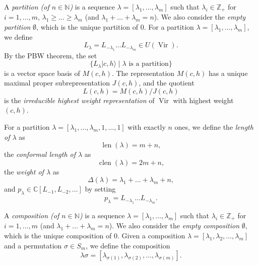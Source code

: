 \documentclass[a4paper, 12pt, reqno]{amsart}
\theoremstyle{remark}
\DeclareMathOperator{\Vir}{Vir}
\DeclareMathOperator{\len}{len}
\DeclareMathOperator{\clen}{clen}
\begin{document}
A \emph{partition (of $n \in \mathbb{N}$)} is a sequence $\lambda = [\lambda_1, \dots, \lambda_m]$ such that $\lambda_i \in \mathbb{Z}_+$ for $i = 1, \dots, m$, $\lambda_1 \ge \dots \ge \lambda_m$ (and $\lambda_1 + \dots + \lambda_m = n$).
We also consider the \emph{empty partition} $\emptyset$, which is the unique partition of $0$.
For a partition $\lambda = [\lambda_1, \dots, \lambda_m]$, we define
\begin{equation*}
  L_{\lambda} = L_{-\lambda_1}\dots L_{-\lambda_m} \in U(\Vir).
\end{equation*}
By the PBW theorem, the set
\begin{equation*}
  \{L_{\lambda}|c, h\rangle \mid \text{$\lambda$ is a partition}\}
\end{equation*}
is a vector space basis of $M(c, h)$.
The representation $M(c, h)$ has a unique maximal proper subrepresentation $J(c, h)$, and the quotient
\begin{equation*}
  L(c, h) = M(c, h)/J(c, h)
\end{equation*}
is the \emph{irreducible highest weight representation} of $\Vir$ with highest weight $(c, h)$.

For a partition $\lambda = [\lambda_1, \dots, \lambda_m, 1, \dots, 1]$ with exactly $n$ ones, we define the \emph{length of $\lambda$} as
\begin{equation*}
  \len(\lambda) = m + n,
\end{equation*}
the \emph{conformal length of $\lambda$} as
\begin{equation*}
  \clen(\lambda) = 2m + n,
\end{equation*}
the \emph{weight of $\lambda$} as
\begin{equation*}
  \Delta(\lambda) = \lambda_1 + \dots + \lambda_m + n,
\end{equation*}
and $p_{\lambda} \in \mathbb{C}[L_{-1}, L_{-2}, \dots]$ by setting
\begin{equation*}
  p_{\lambda} = L_{-\lambda_1}\dots L_{-\lambda_m}.
\end{equation*}

A \emph{composition (of $n \in \mathbb{N}$)} is a sequence $\lambda = [\lambda_1, \dots, \lambda_m]$ such that $\lambda_i \in \mathbb{Z}_+$ for $i = 1, \dots, m$ (and $\lambda_1 + \dots + \lambda_m = n$).
We also consider the \emph{empty composition} $\emptyset$, which is the unique composition of $0$.
Given a composition $\lambda = [\lambda_1, \lambda_2, \dots, \lambda_m]$ and a permutation $\sigma \in S_m$, we define the composition
\begin{equation*}
  \lambda\sigma = [\lambda_{\sigma(1)}, \lambda_{\sigma(2)}, \dots, \lambda_{\sigma(m)}].
\end{equation*}
\end{document}
